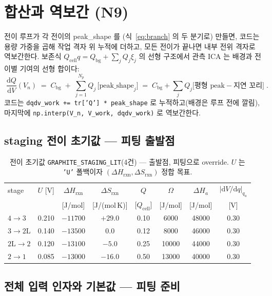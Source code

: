 \documentclass[11pt,a4paper]{article}
\newcommand{\dd}{\mathrm{d}}
\newcommand{\cell}{\mathrm{cell}}
\newcommand{\bg}{\mathrm{bg}}
\newcommand{\rxn}{\mathrm{rxn}}
\newcommand{\code}[1]{\texttt{#1}}
\begin{document}
\section{합산과 역보간 (N9)}\label{sec:sum}
전이 루프가 각 전이의 peak\_shape 를 (식~\eqref{eq:branch} 의 두 분기로) 만들면, 코드는 용량 가중을 곱해 작업 격자 위
누적에 더하고, 모든 전이가 끝나면 내부 전위 격자로 역보간한다. 보존식 $Q_\cell q=Q_\bg+\sum_jQ_j\xi_j$ 의 선형 구조에서
관측 ICA 는 배경과 전이별 기여의 선형 합이다:
\begin{equation}
\boxed{\;\frac{\dd Q}{\dd V}(V_n)\;=\;C_\bg\;+\;\sum_{j=1}^{N_p}Q_j\,
\big[\text{peak\_shape}_j\big]
\;=\;C_\bg+\sum_jQ_j\big[\text{평형 peak}-\text{지연 꼬리}\big]\;.}
\label{eq:sum}
\end{equation}
코드는 \code{dqdv\_work += tr['Q'] * peak\_shape} 로 누적하고(배경은 루프 전에 깔림), 마지막에
\code{np.interp(V\_n, V\_work, dqdv\_work)} 로 역보간한다.

\subsection{staging 전이 초기값 — 피팅 출발점}

\begin{table}[t]
\centering
\renewcommand{\arraystretch}{1.25}
\caption{전이 초기값 \code{GRAPHITE\_STAGING\_LIT}(4건) — 출발점, 피팅으로 override. $U$ 는 \code{'U'}
폴백이자 $(\Delta H_\rxn,\Delta S_\rxn)$ 정합 목표.}
\label{tab:staging}
\begin{tabular}{l c c c c c c c}
\toprule
stage & $U$ [V] & $\Delta H_\rxn$ & $\Delta S_\rxn$ & $Q$ & $\Omega$ & $\Delta H_a$ & $|\dd V/\dd q|_{q_a}$ \\
 &  & [J/mol] & [J/(mol\,K)] & [$Q_\cell$] & [J/mol] & [J/mol] & [V] \\
\midrule
$4\!\to\!3$   & 0.210 & $-11700$ & $+29.0$ & 0.10 & 6000  & 48000 & 0.30 \\
$3\!\to\!2\mathrm L$ & 0.140 & $-13500$ & $0.0$   & 0.12 & 8000  & 46000 & 0.30 \\
$2\mathrm L\!\to\!2$ & 0.120 & $-13100$ & $-5.0$  & 0.25 & 10000 & 44000 & 0.30 \\
$2\!\to\!1$   & 0.085 & $-13000$ & $-16.0$ & 0.50 & 13000 & 40000 & 0.30 \\
\bottomrule
\end{tabular}
\end{table}

\subsection{전체 입력 인자와 기본값 — 피팅 준비}
\end{document}
